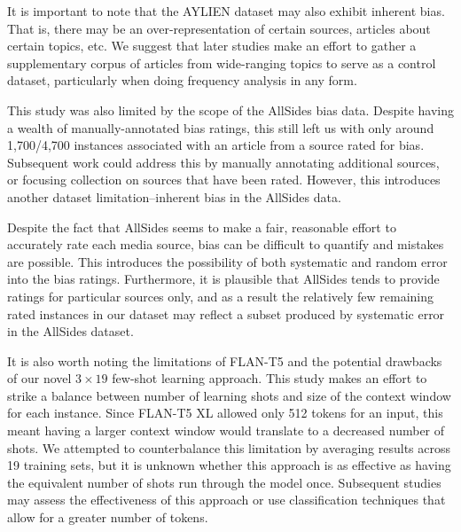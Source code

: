 \documentclass[letterpaper,11pt]{article}
\begin{document}
It is important to note that the AYLIEN dataset may also exhibit inherent bias. That is, there may be an over-representation of certain sources, articles about certain topics, etc. We suggest that later studies make an effort to gather a supplementary corpus of articles from wide-ranging topics to serve as a control dataset, particularly when doing frequency analysis in any form.

This study was also limited by the scope of the AllSides bias data. Despite having a wealth of manually-annotated bias ratings, this still left us with only around 1,700/4,700 instances associated with an article from a source rated for bias. Subsequent work could address this by manually annotating additional sources, or focusing collection on sources that have been rated. However, this introduces another dataset limitation--inherent bias in the AllSides data.

Despite the fact that AllSides seems to make a fair, reasonable effort to accurately rate each media source, bias can be difficult to quantify and mistakes are possible. This introduces the possibility of both systematic and random error into the bias ratings. Furthermore, it is plausible that AllSides tends to provide ratings for particular sources only, and as a result the relatively few remaining rated instances in our dataset may reflect a subset produced by systematic error in the AllSides dataset.

It is also worth noting the limitations of FLAN-T5 and the potential drawbacks of our novel $3 \times 19$ few-shot learning approach. This study makes an effort to strike a balance between number of learning shots and size of the context window for each instance. Since FLAN-T5 XL allowed only 512 tokens for an input, this meant having a larger context window would translate to a decreased number of shots. We attempted to counterbalance this limitation by averaging results across 19 training sets, but it is unknown whether this approach is as effective as having the equivalent number of shots run through the model once. Subsequent studies may assess the effectiveness of this approach or use classification techniques that allow for a greater number of tokens.
\end{document}
